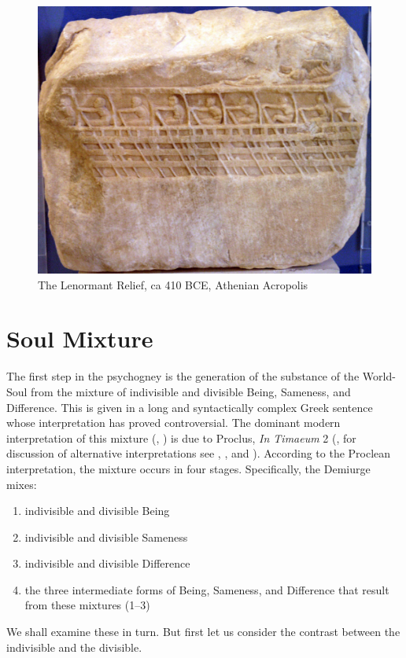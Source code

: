 \begin{figure}[htbp]
     \centering
         \includegraphics[scale=0.30]{graphics/trireme.jpg}
     \caption{The Lenormant Relief, ca 410 BCE, Athenian Acropolis}
     \label{fig:trireme}
\end{figure}


\section{Soul Mixture} %
\label{sec:soul_mixture}

The first step in the psychogney is the generation of the substance of the World-Soul from the mixture of indivisible and divisible Being, Sameness, and Difference. This is given in a long and syntactically complex Greek sentence whose interpretation has proved controversial. The dominant modern interpretation of this mixture (\citealt{Grube:1932qr}, \citealt[60--1]{Cornford:1935fk} \citealt[70--1]{Robinson:1970lq}) is due to Proclus, \emph{In Timaeum} 2 (\citealt{Diehl:1903re}, for discussion of alternative interpretations see \citealt[106--36]{Taylor:1928qb}, \citealt[51--54]{Shorey:1889sx}, and \citealt[352]{Shorey:1928ar}). According to the Proclean interpretation, the mixture occurs in four stages. Specifically, the Demiurge mixes:
\begin{enumerate}[(1)]
	\item indivisible and divisible Being
	\item indivisible and divisible Sameness
	\item indivisible and divisible Difference
	\item the three intermediate forms of Being, Sameness, and Difference that result from these mixtures (1--3)
\end{enumerate} 
We shall examine these in turn. But first let us consider the contrast between the indivisible and the divisible.

